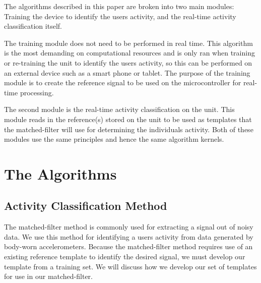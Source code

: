 \documentclass[journal]{IEEEtran}
\begin{document}
The algorithms described in this paper are broken into two main modules: Training the device to identify the user\textquotesingle s activity, and the real-time activity classification itself.

The training module does not need to be performed in real time.
This algorithm is the most demanding on computational resources and is only ran when training or re-training the unit to identify the user\textquotesingle s activity, so this can be performed on an external device such as a smart phone or tablet.
The purpose of the training module is to create the reference signal to be used on the microcontroller for real-time processing.

The second module is the real-time activity classification on the unit.
This module reads in the reference(s) stored on the unit to be used as templates that the matched-filter will use for determining the individual\textquotesingle s activity.
Both of these modules use the same principles and hence the same algorithm kernels.
%
\section{The Algorithms}
%
\subsection{Activity Classification Method}
The matched-filter method is commonly used for extracting a signal out of noisy data.
We use this method for identifying a user\textquotesingle s activity from data generated by body-worn accelerometers.
Because the matched-filter method requires use of an existing reference template to identify the desired signal, we must develop our template from a training set.
We will discuss how we develop our set of templates for use in our matched-filter.
\end{document}
